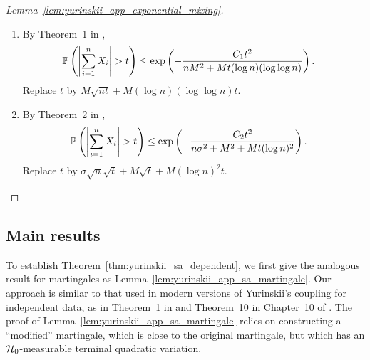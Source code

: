 \begin{proof}[Lemma~\ref{lem:yurinskii_app_exponential_mixing}]

  \begin{enumerate}[label=(\roman*)]

    \item
      By Theorem~1 in \citet{merlevede2009bernstein},
      \begin{align*}
        \P\left(
          \left|
          \sum_{i=1}^n
          X_i
          \right|
          > t
        \right)
        &\leq
        \exp\left(
          -\frac{C_1 t^2}{n M^2 + Mt (\log n)(\log\log n)}
        \right).
      \end{align*}
      Replace $t$ by
      $M \sqrt{n t} + M (\log n)(\log \log n) t$.

    \item
      By Theorem~2 in \citet{merlevede2009bernstein},
      \begin{align*}
        \P\left(
          \left|
          \sum_{i=1}^n
          X_i
          \right|
          > t
        \right)
        &\leq
        \exp\left(
          -\frac{C_2 t^2}{n\sigma^2 + M^2 + Mt (\log n)^2}
        \right).
      \end{align*}
      Replace $t$ by
      $\sigma \sqrt n \sqrt t + M \sqrt t + M (\log n)^2 t$.
  \end{enumerate}
\end{proof}

\subsection{Main results}

To establish Theorem~\ref{thm:yurinskii_sa_dependent}, we first
give the analogous result
for martingales as Lemma~\ref{lem:yurinskii_app_sa_martingale}. Our approach is
similar to
that used in modern versions of Yurinskii's coupling for independent data, as
in Theorem~1 in \citet{lecam1988} and Theorem~10 in Chapter~10 of
\citet{pollard2002user}. The proof of
Lemma~\ref{lem:yurinskii_app_sa_martingale} relies on
constructing a ``modified'' martingale, which is close to the original
martingale, but which has an $\cH_0$-measurable terminal quadratic variation.

